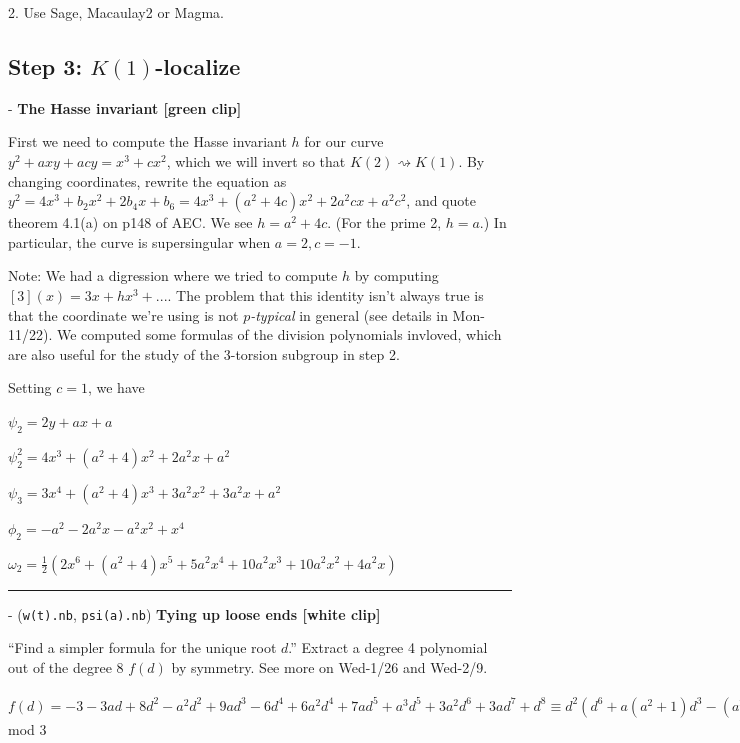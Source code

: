 \documentclass{rs}
\theoremstyle{definition}
\theoremstyle{remark}
\renewcommand{\=}{\approx}
\renewcommand{\-}{\sim}
\numberwithin{equation}{section}
\numberwithin{thm}{section}
\begin{document}
2. Use Sage, Macaulay2 or Magma.


\newpage
\subsection{Step 3: $K(1)$-localize}

- \textbf{The Hasse invariant [green clip]}

First we need to compute the Hasse invariant $h$ for our curve $y^2 + a x y + a c y = x^3 + c x^2$, which we will invert so that $K(2) \rightsquigarrow K(1)$. 
By changing coordinates, rewrite the equation as $y^2 = 4x^3 + b_2 x^2 + 2b_4 x + b_6 = 4x^3 + (a^2 + 4c) x^2 + 2a^2 c x + a^2 c^2$, and quote theorem 4.1(a) on p148 of AEC. 
We see $h = a^2 + 4c$. (For the prime 2, $h = a$.) In particular, the curve is supersingular when $a = 2, c = -1$.

Note: We had a digression where we tried to compute $h$ by computing $[3] (x) = 3x + h x^3 + ...$. 
The problem that this identity isn't always true is that the coordinate we're using is not \textit{$p$-typical} in general (see details in Mon-11/22). 
We computed some formulas of the division polynomials invloved, which are also useful for the study of the 3-torsion subgroup in step 2.

Setting $c = 1$, we have

$\psi_2 = 2y + a x + a$

$\psi_2^2 = 4x^3 + (a^2 + 4) x^2 + 2a^2 x + a^2$

$\psi_3 = 3x^4 + (a^2 + 4) x^3 + 3a^2 x^2 + 3a^2 x + a^2$

$\phi_2 = -a^2 - 2 a^2 x - a^2 x^2 + x^4$

$\omega_2 = \frac{1}{2}(2x^6 + (a^2 + 4) x^5 + 5a^2 x^4 + 10a^2 x^3 + 10a^2 x^2 + 4a^2 x)$\\

\hrule

- (\texttt{w(t).nb}, \texttt{psi(a).nb}) \textbf{Tying up loose ends [white clip]}

``Find a simpler formula for the unique root $d$.'' Extract a degree 4 polynomial out of the degree 8 $f(d)$ by symmetry. See more on Wed-1/26 and Wed-2/9.

$f(d) = -3 - 3 a d + 8 d^2 - a^2 d^2 + 9 a d^3 - 6 d^4 + 6 a^2 d^4 + 7 a d^5 +
  a^3 d^5 + 3 a^2 d^6 + 3 a d^7 + d^8 \equiv d^2 (d^6 + a (a^2 + 1) d^3 - (a^2 + 1)) \equiv [d (d + a)^3]^2$ mod 3

\begin{center}
\end{center}
\end{document}
